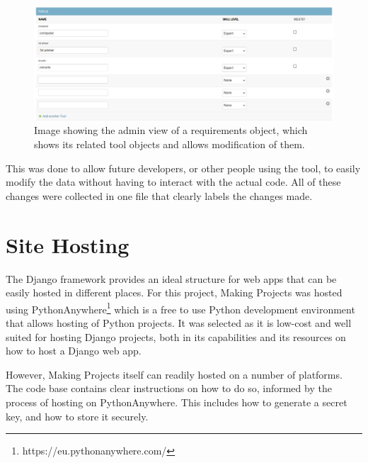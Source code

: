 \documentclass{l4proj}
\begin{document}
\begin{figure}[htb]
    \centering
    \includegraphics[width=0.75\linewidth]{images/related_tools.png}    

    \caption{Image showing the admin view of a requirements object, which shows its related tool objects and allows modification of them.
    }
    \label{fig:related_tools} 
\end{figure}

This was done to allow future developers, or other people using the tool, to easily modify the data without having to interact with the actual code. 
All of these changes were collected in one file that clearly labels the changes made. 



\section{Site Hosting}
The Django framework provides an ideal structure for web apps that can be easily hosted in different places. For this project, Making Projects was hosted using PythonAnywhere\footnote{https://eu.pythonanywhere.com/} which is a free to use Python development environment that allows hosting of Python projects.  
It was selected as it is low-cost and well suited for hosting Django projects, both in its capabilities and its resources on how to host a Django web app.  

However, Making Projects itself can readily hosted on a number of platforms. The code base contains clear instructions on how to do so, informed by the process of hosting on PythonAnywhere. This includes how to generate a secret key, and how to store it securely. 
\end{document}
